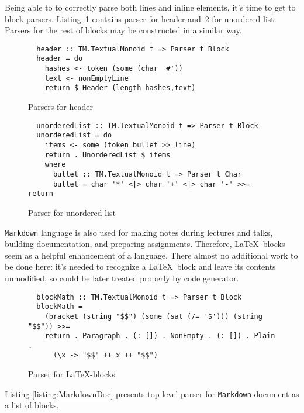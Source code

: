   Being able to to correctly parse both lines and inline elements, it's 
  time to get to block parsers. Listing~\ref{listing:MarkdownHeader} contains 
  parser for header and~\ref{listing:markdownUlist} for unordered list. Parsers 
  for the rest of blocks may be constructed in a similar way.

  \begin{figure}[t]
  \begin{lstlisting}
  header :: TM.TextualMonoid t => Parser t Block
  header = do
    hashes <- token (some (char '#'))
    text <- nonEmptyLine
    return $ Header (length hashes,text)
  \end{lstlisting}
  \caption{Parsers for header}
  \label{listing:MarkdownHeader}
  \end{figure}

  \begin{figure}[t]
  \begin{lstlisting}
  unorderedList :: TM.TextualMonoid t => Parser t Block
  unorderedList = do
    items <- some (token bullet >> line)
    return . UnorderedList $ items
    where
      bullet :: TM.TextualMonoid t => Parser t Char
      bullet = char '*' <|> char '+' <|> char '-' >>= return
  \end{lstlisting}
  \caption{Parser for unordered list}
  \label{listing:markdownUlist}
  \end{figure}

  \lstinline{Markdown} language is also used for making notes during lectures 
  and talks, building documentation, and preparing assignments. Therefore, 
  \LaTeX~blocks seem as a helpful enhancement of a language. There almost no 
  additional work to be done here: it's needed to recognize a \LaTeX~block and 
  leave its contents unmodified, so could be later treated properly 
  by code generator.      

  \begin{figure}[h]
  \begin{lstlisting}
  blockMath :: TM.TextualMonoid t => Parser t Block
  blockMath =
    (bracket (string "$$") (some (sat (/= '$'))) (string "$$")) >>=
    return . Paragraph . (: []) . NonEmpty . (: []) . Plain .
      (\x -> "$$" ++ x ++ "$$")
  \end{lstlisting}
  \caption{Parser for \LaTeX-blocks}
  \label{listing:MarkdownLaTeX}
  \end{figure}

  Listing \ref{listing:MarkdownDoc} presents top-level parser for 
  \lstinline{Markdown}-document as a list of blocks.

